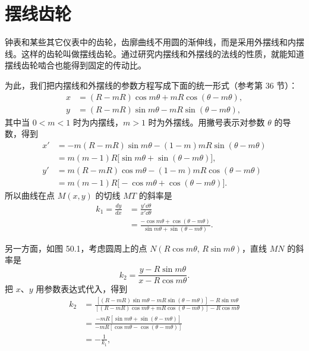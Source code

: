\section{摆线齿轮}

钟表和某些其它仪表中的齿轮，齿廓曲线不用圆的渐伸线，而是采用外摆线和内摆线。这样的齿轮叫做摆线齿轮。通过研究内摆线和外摆线的法线的性质，就能知道摆线齿轮啮合也能得到固定的传动比。

为此，我们把内摆线和外摆线的参数方程写成下面的统一形式（参考第 36 节）：
\begin{align*}
  x &= (R-mR)\cos m\theta + mR\cos(\theta-m\theta), \\
  y &= (R-mR)\sin m\theta - mR\sin(\theta-m\theta),
\end{align*}
其中当 $0<m<1$ 时为内摆线，$m>1$ 时为外摆线。用撇号表示对参数 $\theta$ 的导数，得到
\begin{align*}
  x' &= -m(R-mR)\sin m\theta - (1-m)mR\sin(\theta-m\theta) \\
     &= m(m-1)R\bigl[\sin m\theta + \sin(\theta-m\theta)\bigr], \\
  y' &= m(R-mR)\cos m\theta - (1-m)mR\cos(\theta-m\theta) \\
     &= m(m-1)R\bigl[-\cos m\theta + \cos(\theta-m\theta)\bigr].
\end{align*}
所以曲线在点 $M(x,y)$ 的切线 $MT$ 的斜率是
\begin{align*}
  k_1 = \frac{dy}{dx} &= \frac{y'\dd\theta}{x'\dd\theta} \\
                      &= \frac{-\cos m\theta + \cos(\theta-m\theta)}{\sin m\theta + \sin(\theta-m\theta)}.
\end{align*}

另一方面，如图 50.1，考虑圆周上的点 $N(R\cos m\theta,\, R\sin m\theta)$，直线 $MN$ 的斜率是
\[
  k_2 = \frac{y - R\sin m\theta}{x - R\cos m\theta}.
\]
把 $x$、$y$ 用参数表达式代入，得到
\begin{align*}
  k_2 &= \frac{[(R-mR)\sin m\theta - mR\sin(\theta-m\theta)] - R\sin m\theta}{[(R-mR)\cos m\theta + mR\cos(\theta-m\theta)] - R\cos m\theta} \\
      &= \frac{-mR[\sin m\theta + \sin(\theta-m\theta)]}{-mR[\cos m\theta - \cos(\theta-m\theta)]} \\
      &= -\frac{1}{k_1},
\end{align*}


